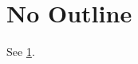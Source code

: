 \documentclass{article}
\begin{document}
\section{No Outline}\label{sec:n}
See \ref{sec:n}.
\end{document}
